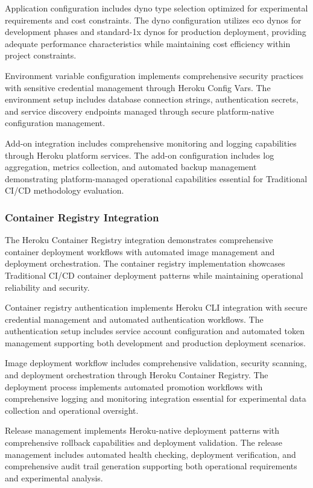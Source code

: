 Application configuration includes dyno type selection optimized for experimental requirements and cost constraints. The dyno configuration utilizes eco dynos for development phases and standard-1x dynos for production deployment, providing adequate performance characteristics while maintaining cost efficiency within project constraints.

Environment variable configuration implements comprehensive security practices with sensitive credential management through Heroku Config Vars. The environment setup includes database connection strings, authentication secrets, and service discovery endpoints managed through secure platform-native configuration management.

Add-on integration includes comprehensive monitoring and logging capabilities through Heroku platform services. The add-on configuration includes log aggregation, metrics collection, and automated backup management demonstrating platform-managed operational capabilities essential for Traditional CI/CD methodology evaluation.

\subsubsection{Container Registry Integration}

The Heroku Container Registry integration demonstrates comprehensive container deployment workflows with automated image management and deployment orchestration. The container registry implementation showcases Traditional CI/CD container deployment patterns while maintaining operational reliability and security.

Container registry authentication implements Heroku CLI integration with secure credential management and automated authentication workflows. The authentication setup includes service account configuration and automated token management supporting both development and production deployment scenarios.

Image deployment workflow includes comprehensive validation, security scanning, and deployment orchestration through Heroku Container Registry. The deployment process implements automated promotion workflows with comprehensive logging and monitoring integration essential for experimental data collection and operational oversight.

Release management implements Heroku-native deployment patterns with comprehensive rollback capabilities and deployment validation. The release management includes automated health checking, deployment verification, and comprehensive audit trail generation supporting both operational requirements and experimental analysis.

